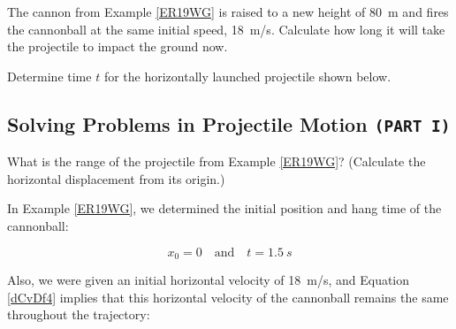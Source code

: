 \documentclass[main-physics.tex]{subfiles}
\begin{document}
\begin{exercise} \label{mT7mjd}
    The cannon from Example \ref{ER19WG} is raised to a new height of \SI{80}{m} and fires the cannonball at the same initial speed, \SI{18}{m/s}. Calculate how long it will take the projectile to impact the ground now.
\end{exercise}

\begin{exercise} \label{VllZAi}
    Determine time $t$ for the horizontally launched projectile shown below.
\end{exercise}
    
\begin{center}
\end{center}


\subsection{Solving Problems in Projectile Motion \texttt{(PART I)} \label{NruNJk}}

\begin{example} \label{jKndVF}
    What is the range of the projectile from Example \ref{ER19WG}? (Calculate the horizontal displacement from its origin.)
\end{example}

\Solution In Example \ref{ER19WG}, we determined the initial position and hang time of the cannonball:

\begin{equation*}
    x_0 = 0 \quad \text{and} \quad t = \SI{1.5}{s}
\end{equation*}

Also, we were given an initial horizontal velocity of \SI{18}{m/s}, and Equation \eqref{dCvDf4} implies that this horizontal velocity of the cannonball remains the same throughout the trajectory:
\end{document}
